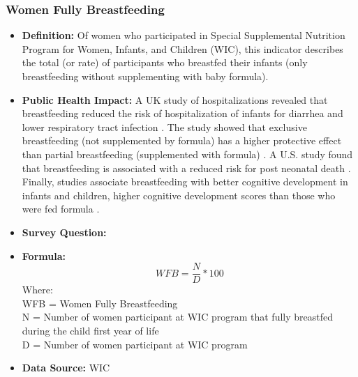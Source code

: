\documentclass[12pt,letterpaper]{report}
\begin{document}
\subsubsection{Women Fully Breastfeeding}
\begin{itemize}
		\item \textbf{Definition:} Of women who participated in Special Supplemental Nutrition Program for Women, Infants, and Children (WIC), this indicator describes the total (or rate) of participants who breastfed their infants (only breastfeeding without supplementing with baby formula). 
		\item \textbf{Public Health Impact:} A UK study of hospitalizations revealed that breastfeeding reduced the risk of hospitalization of infants for diarrhea and lower respiratory tract infection \cite{quigley2007breastfeeding}. The study showed that exclusive breastfeeding (not supplemented by formula) has a higher protective effect than partial breastfeeding (supplemented with formula) \cite{quigley2007breastfeeding}. A U.S. study found that breastfeeding is associated with a reduced risk for post neonatal death \cite{chen2004breastfeeding}. Finally, studies associate breastfeeding with better cognitive development in infants and children, higher cognitive development scores than those who were fed formula \cite{anderson1999breast}. 
		\item \textbf{Survey Question:}
		\item \textbf{Formula:} 
			\begin{equation}
				WFB = \frac{N}{D} *100
			\end{equation}
Where: \\
			WFB = Women Fully Breastfeeding \\
			
			N = Number of women participant at WIC program that fully breastfed during the child first year of life \\
			
			D = Number of women participant at WIC program \\
			
		\item \textbf{Data Source:} WIC 
	\end{itemize}
\end{document}
